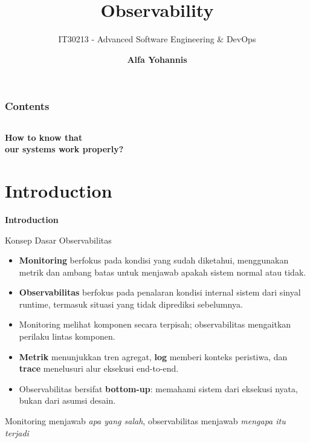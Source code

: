 \documentclass[aspectratio=169, table]{beamer}
\title{\Huge Observability \\
	\vspace{10pt}}
\subtitle{IT30213 - Advanced Software Engineering \& DevOps}
\author{\textbf{Alfa Yohannis}}
\begin{document}
	
	\frame{\titlepage}
	

	\begin{frame}[fragile]
		\frametitle{Contents}
		\vspace{20pt}
		\begin{columns}[t]
			\tableofcontents[sections={1-5}]
			
			\tableofcontents[sections={6-20}]
		\end{columns}
	\end{frame}
	
	\begin{frame}{\hfill}
		\centering
		\Huge{\textbf{How to know that\\our systems work properly?}}
	\end{frame}
	
	\section{Introduction}
	
	\begin{frame}{\hfill}
		\centering
		\Huge{\textbf{Introduction}}
	\end{frame}
	
	\begin{frame}{Konsep Dasar Observabilitas}
	\vspace{6pt}
	\begin{itemize}
		\item \textbf{Monitoring} berfokus pada kondisi yang sudah diketahui, menggunakan metrik dan ambang batas untuk menjawab apakah sistem normal atau tidak.
		\item \textbf{Observabilitas} berfokus pada penalaran kondisi internal sistem dari sinyal runtime, termasuk situasi yang tidak diprediksi sebelumnya.
		\item Monitoring melihat komponen secara terpisah; observabilitas mengaitkan perilaku lintas komponen.
		\item \textbf{Metrik} menunjukkan tren agregat, \textbf{log} memberi konteks peristiwa, dan \textbf{trace} menelusuri alur eksekusi end-to-end.
		\item Observabilitas bersifat \textbf{bottom-up}: memahami sistem dari eksekusi nyata, bukan dari asumsi desain.
	\end{itemize}
	
	\vspace{4pt}
	{\footnotesize Monitoring menjawab \emph{apa yang salah}, observabilitas menjawab \emph{mengapa itu terjadi}}
\end{frame}
\end{document}
